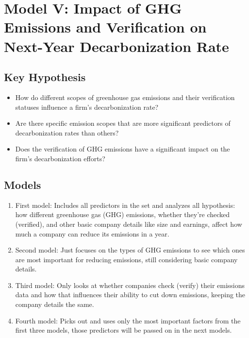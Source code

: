 \section{Model V: Impact of GHG Emissions and Verification on Next-Year Decarbonization Rate}

\subsection{Key Hypothesis}
\begin{itemize}
    \item How do different scopes of greenhouse gas emissions and their verification statuses influence a firm's decarbonization rate?
    \item Are there specific emission scopes that are more significant predictors of decarbonization rates than others?
    \item Does the verification of GHG emissions have a significant impact on the firm's decarbonization efforts?
\end{itemize}

\subsection{Models}
\begin{enumerate}
    \item First model: Includes all predictors in the set and analyzes all hypothesis: how different greenhouse gas (GHG) emissions, whether they're checked (verified), and other basic company details like size and earnings, affect how much a company can reduce its emissions in a year.
    \item Second model: Just focuses on the types of GHG emissions to see which ones are most important for reducing emissions, still considering basic company details.
    \item Third model: Only looks at whether companies check (verify) their emissions data and how that influences their ability to cut down emissions, keeping the company details the same.
    \item Fourth model: Picks out and uses only the most important factors from the first three models, those predictors will be passed on in the next models.
\end{enumerate}



